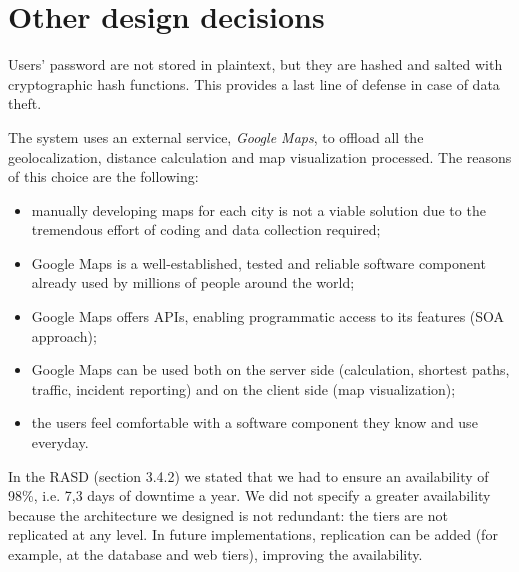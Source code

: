 \section{Other design decisions}
\label{sec:other-design-decisions}

Users' password are not stored in plaintext, but they are hashed and salted with cryptographic hash functions. This provides a last line of defense in case of data theft.

The system uses an external service, \emph{Google Maps}, to offload all the geolocalization, distance calculation and map visualization processed. The reasons of this choice are the following:
\begin{itemize}
    \item manually developing maps for each city is not a viable solution due to the tremendous effort of coding and data collection required;
    \item Google Maps is a well-established, tested and reliable software component already used by millions of people around the world;
    \item Google Maps offers APIs, enabling programmatic access to its features (SOA approach);
    \item Google Maps can be used both on the server side (calculation, shortest paths, traffic, incident reporting) and on the client side (map visualization);
    \item the users feel comfortable with a software component they know and use everyday.
\end{itemize}

In the RASD (section 3.4.2) we stated that we had to ensure an availability of 98\%, i.e. 7,3 days of downtime a year.
We did not specify a greater availability because the architecture we designed is not redundant: the tiers are not replicated at any level.
In future implementations, replication can be added (for example, at the database and web tiers), improving the availability.

